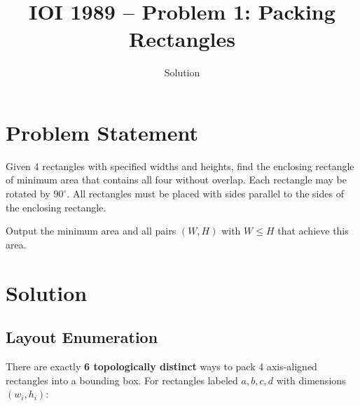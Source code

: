 \documentclass[11pt,a4paper]{article}
\title{IOI 1989 -- Problem 1: Packing Rectangles}
\author{Solution}
\date{}
\begin{document}
\maketitle

\section{Problem Statement}

Given 4 rectangles with specified widths and heights, find the enclosing
rectangle of minimum area that contains all four without overlap. Each
rectangle may be rotated by $90^\circ$. All rectangles must be placed with
sides parallel to the sides of the enclosing rectangle.

Output the minimum area and all pairs $(W, H)$ with $W \le H$ that achieve
this area.

\section{Solution}

\subsection{Layout Enumeration}

There are exactly \textbf{6 topologically distinct} ways to pack 4
axis-aligned rectangles into a bounding box. For rectangles labeled
$a, b, c, d$ with dimensions $(w_i, h_i)$:
\end{document}
